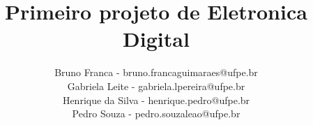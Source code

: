 \documentclass[undgrad,numbers]{Controle/DES}
\begin{document}
\title{Primeiro projeto de Eletronica Digital} %
\author{Bruno Franca - bruno.francaguimaraes@ufpe.br
  \\ Gabriela Leite - gabriela.lpereira@ufpe.br
  \\ Henrique da Silva - henrique.pedro@ufpe.br
  \\ Pedro Souza - pedro.souzaleao@ufpe.br}{} %

\newcommand{\exinsto}{Universidade Federal de Pernambuco} %


\newcommand{\exinstum}{Universidade Federal de Pernambuco} %

\newcommand{\exinstdois}{Universidade Federal de Pernambuco} %

\date{\the\month}{\the\year}

\newcommand{\Datadadefesa}{xx/xx/20xx}%

\mainmatter

\tableofcontents
\thispagestyle{empty}

\listoffigures %
\listoftables %

\pagestyle{plain}
\backmatter


\appendix %

\anexos  %
\end{document}
